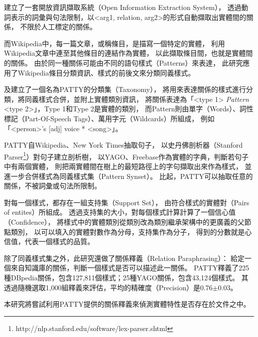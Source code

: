 \cite{reverb} 建立了一套開放資訊擷取系統（Open Information Extraction System），
透過動詞表示的詞彙與句法限制，以<arg1, relation, arg2>的形式自動擷取出實體間的關係，
不限於人工標定的關係。

而Wikipedia中，每一篇文章，或稱條目，是描寫一個特定的實體，
\cite{wisenet} 利用Wikipedia文章中連至其他條目的連結作為實體，
以此擷取條目間，也就是實體間的關係。
由於同一種關係可能由不同的語句樣式（Patterns）來表達，
此研究應用了Wikipedia條目分類資訊、樣式的前後文來分類同義樣式。

\cite{patty2012}及\cite{patty}建立了一個名為PATTY的分類集（Taxonomy），
將用來表達關係的樣式進行分類，將同義樣式合併，並附上實體類別資訊，
將關係表達為「<type 1> \emph{Pattern} <type 2>」，Type 1和Type 2是實體的類別，
而Pattern則由單字（Words）、詞性標記（Part-Of-Speech Tags）、萬用字元（Wildcards）所組成，
例如「<person>'s [adj] voice * <song>」。   %

PATTY自Wikipedia、New York Times抽取句子，
以史丹佛剖析器（Stanford Parser\footnote{http://nlp.stanford.edu/software/lex-parser.shtml}）對句子建立剖析樹，
以YAGO、Freebase作為實體的字典，判斷若句子中有兩個實體，
則把兩實體間在樹上的最短路徑上的字句擷取出來作為樣式，
並進一步合併樣式為同義樣式集（Pattern Synset）。
比起\cite{reverb}，PATTY可以抽取任意的關係，不被詞彙或句法所限制。

對每一個樣式，都存在一組支持集（Support Set），
由符合樣式的實體對（Pairs of entites）所組成。
透過支持集的大小，對每個樣式計算計算了一個信心值（Confidence），
將樣式中的實體類別從類別改為類別繼承架構中的更廣義的父節點類別，
以可以填入的實體對數作為分母，支持集作為分子，
得到的分數就是心信值，代表一個樣式的品質。

除了同義樣式集之外，此研究還做了關係釋義（Relation Paraphrasing）：
給定一個來自知識庫的關係，判斷一個樣式是否可以描述此一關係。
PATTY釋義了225種DBpedia關係，包含127,811個樣式；25種YAGO關係，包含43,124個樣式。
其透過隨機選取1,000組釋義來評估，平均的精確度（Precision）是0.76$\pm$0.03。

本研究將嘗試利用PATTY提供的關係釋義來偵測實體特性是否存在於文件之中。   %

